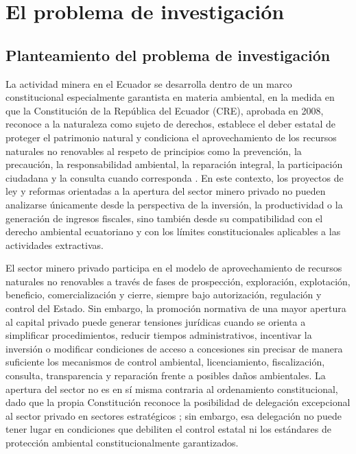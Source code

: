 
\chapter{El problema de investigación}

\section{Planteamiento del problema de investigación}

La actividad minera en el Ecuador se desarrolla dentro de un marco constitucional especialmente garantista en materia ambiental, en la medida en que la Constitución de la República del Ecuador (CRE), aprobada en 2008, reconoce a la naturaleza como sujeto de derechos, establece el deber estatal de proteger el patrimonio natural y condiciona el aprovechamiento de los recursos naturales no renovables al respeto de principios como la prevención, la precaución, la responsabilidad ambiental, la reparación integral, la participación ciudadana y la consulta cuando corresponda \parencite[arts.~71--74, 395--399]{cre_2008}. En este contexto, los proyectos de ley y reformas orientadas a la apertura del sector minero privado no pueden analizarse únicamente desde la perspectiva de la inversión, la productividad o la generación de ingresos fiscales, sino también desde su compatibilidad con el derecho ambiental ecuatoriano y con los límites constitucionales aplicables a las actividades extractivas.

El sector minero privado participa en el modelo de aprovechamiento de recursos naturales no renovables a través de fases de prospección, exploración, explotación, beneficio, comercialización y cierre, siempre bajo autorización, regulación y control del Estado. Sin embargo, la promoción normativa de una mayor apertura al capital privado puede generar tensiones jurídicas cuando se orienta a simplificar procedimientos, reducir tiempos administrativos, incentivar la inversión o modificar condiciones de acceso a concesiones sin precisar de manera suficiente los mecanismos de control ambiental, licenciamiento, fiscalización, consulta, transparencia y reparación frente a posibles daños ambientales. La apertura del sector no es en sí misma contraria al ordenamiento constitucional, dado que la propia Constitución reconoce la posibilidad de delegación excepcional al sector privado en sectores estratégicos \parencite[art.~316]{cre_2008}; sin embargo, esa delegación no puede tener lugar en condiciones que debiliten el control estatal ni los estándares de protección ambiental constitucionalmente garantizados.

